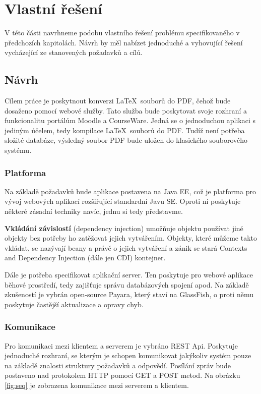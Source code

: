 \chapter{Vlastní řešení}  

V této části navrhneme podobu vlastního řešení problému specifikovaného v předchozích kapitolách. Návrh by měl nabízet jednoduché a vyhovující řešení vycházející ze stanovených požadavků a cílů. 

\section{Návrh}

Cílem práce je poskytnout konverzi \LaTeX\ souborů do PDF, čehož bude dosaženo pomocí webové služby. Tato služba bude poskytovat svoje rozhraní a funkcionalitu portálům Moodle a CourseWare. Jedná se o jednoduchou aplikaci s jediným účelem, tedy kompilace \LaTeX\ souborů do PDF. Tudíž není potřeba složité databáze, výsledný soubor PDF bude uložen do klasického souborového systému. 

\subsection{Platforma}
Na základě požadavků bude aplikace postavena na Java EE, což je platforma pro vývoj webových aplikací rozšiřující standardní Javu SE. Oproti ní poskytuje některé zásadní techniky navíc, jednu si tedy představme. 
\par
\textbf{Vkládání závislostí} (dependency injection) umožňuje objektu používat jiné objekty bez potřeby ho zatěžovat jejich vytvářením. Objekty, které můžeme takto vkládat, se nazývají beany a právě o jejich vytváření a zánik se stará Contexts and Dependency Injection (dále jen CDI) kontejner.
\\[12pt]
\par
Dále je potřeba specifikovat aplikační server. Ten poskytuje pro webové aplikace běhové prostředí, tedy zajišťuje správu databázových spojení apod. Na základě zkušeností je vybrán open-source Payara, který staví na GlassFish, o proti němu poskytuje častější aktualizace a opravy chyb. 

\subsection{Komunikace}
Pro komunikaci mezi klientem a serverem je vybráno REST Api. Poskytuje jednoduché rozhraní, se kterým je schopen komunikovat jakýkoliv systém pouze na základě znalosti struktury požadavků a odpovědí. Posílání zpráv bude postaveno nad protokolem HTTP pomocí GET a POST metod. Na obrázku \ref{fig:seq} je zobrazena komunikace mezi serverem a klientem. 

